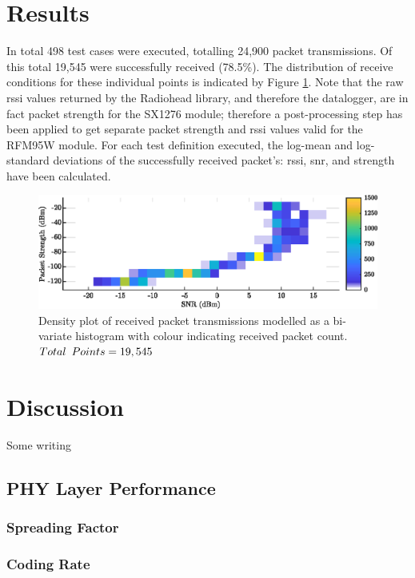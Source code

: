 \section{Results}
In total 498 test cases were executed, totalling 24,900 packet transmissions. Of this total 19,545 were successfully received (78.5\%). The distribution of receive conditions for these individual points is indicated by Figure \ref{fig:density_plot}. Note that the raw \ac{rssi} values returned by the Radiohead library, and therefore the datalogger, are in fact packet strength for the SX1276 module; therefore a post-processing step has been applied to get separate packet strength and \ac{rssi} values valid for the RFM95W module. For each test definition executed, the log-mean and log-standard deviations of the successfully received packet's: \ac{rssi}, \ac{snr}, and strength have been calculated.
\begin{figure}[H]
    \centering
   	\includegraphics{Figures/density_plot}
    \caption[Test data distribution plot]{
    Density plot of received packet transmissions modelled as a bi-variate histogram with colour indicating received packet count. \\$Total\enskip Points = 19,545$
    }
    \label{fig:density_plot}
\end{figure}

\section{Discussion}
Some writing
\subsection{PHY Layer Performance}

\subsubsection{Spreading Factor}

\subsubsection{Coding Rate}

